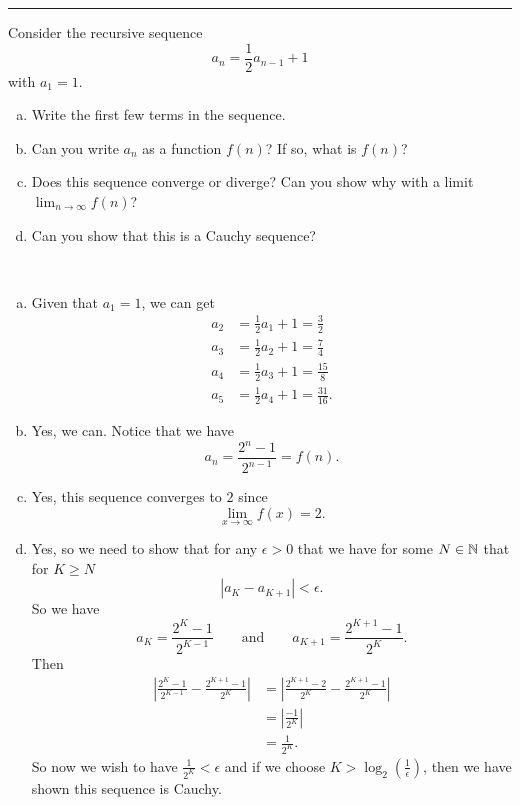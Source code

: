 \documentclass[12pt]{article} %
\begin{document}
\hrule
\begin{problem}
Consider the recursive sequence
\[
a_n = \frac{1}{2} a_{n-1} + 1
\]
with $a_1 = 1$.  
\begin{enumerate}[(a)]
    \item Write the first few terms in the sequence.
    \item Can you write $a_n$ as a function $f(n)$? If so, what is $f(n)$?
    \item Does this sequence converge or diverge? Can you show why with a limit $\lim_{n\to \infty} f(n)$?
    \item Can you show that this is a Cauchy sequence?
\end{enumerate}
\end{problem}
\begin{solution}~
\begin{enumerate}[(a)]
    \item Given that $a_1 = 1$, we can get
    \begin{align*}
        a_2 &= \frac{1}{2}a_1 +1 = \frac{3}{2}\\
        a_3 &= \frac{1}{2}a_2 +1 = \frac{7}{4}\\
        a_4 &= \frac{1}{2}a_3 +1 = \frac{15}{8}\\
        a_5 &= \frac{1}{2}a_4 +1 = \frac{31}{16}.
    \end{align*}
    \item Yes, we can.  Notice that we have
    \[
    a_n = \frac{2^n -1}{2^{n-1}} = f(n).
    \]
    \item Yes, this sequence converges to $2$ since
    \[
    \lim_{x\to \infty} f(x) = 2.
    \]
    \item Yes, so we need to show that for any $\epsilon>0$ that we have for some $N\in \mathbb{N}$ that for $K\geq N$ 
    \[
    |a_{K}-a_{K+1}|<\epsilon.
    \]
    So we have
    \[
    a_K = \frac{2^K -1 }{2^{K-1}} \qquad \textrm{and} \qquad a_{K+1} = \frac{2^{K+1}-1}{2^K}.
    \]
    Then
    \begin{align*}
        \left| \frac{2^K-1}{2^{K-1}}-\frac{2^{K+1}-1}{2^K}\right|&=\left| \frac{2^{K+1}-2}{2^K}-\frac{2^{K+1}-1}{2^K}\right|\\
        &= \left| \frac{-1}{2^K}\right|\\
        &= \frac{1}{2^K}.
    \end{align*}
    So now we wish to have $\frac{1}{2^K}<\epsilon$ and if we choose $K>\log_2\left(\frac{1}{\epsilon}\right)$, then we have shown this sequence is Cauchy.
\end{enumerate}
\end{solution}
\end{document}
